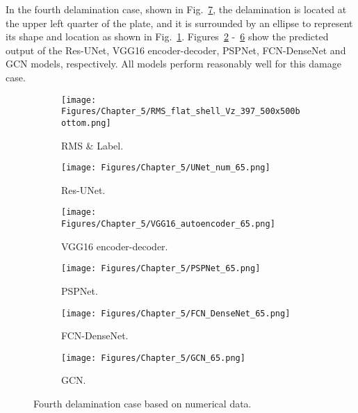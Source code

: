 In the fourth delamination case, shown in Fig.~\ref{fig:rms_fourth_case}, the delamination is located at the upper left quarter of the plate, and it is surrounded by an ellipse to represent its shape and location as shown in Fig.~\ref{fig:RMS_bottom_397}.
Figures~\ref{fig:unet_65} -~\ref{fig:gcn_65} show the predicted output of the Res-UNet, VGG16 encoder-decoder, PSPNet, FCN-DenseNet and GCN models, respectively. 
All models perform reasonably well for this damage case.
\begin{figure} [!h]
	\centering
	\begin{subfigure}[b]{.48\textwidth}
		\centering
		\texttt{[image: Figures/Chapter\_5/RMS\_flat\_shell\_Vz\_397\_500x500bottom.png]}
		\caption{RMS \& Label.}
		\label{fig:RMS_bottom_397}
	\end{subfigure}
	\hfill
	\begin{subfigure}[b]{.48\textwidth}
		\centering
		\texttt{[image: Figures/Chapter\_5/UNet\_num\_65.png]}
		\caption{Res-UNet.}
		\label{fig:unet_65}	
	\end{subfigure}
	\hfill
	\begin{subfigure}[b]{.48\textwidth}
		\centering
		\texttt{[image: Figures/Chapter\_5/VGG16\_autoencoder\_65.png]}
		\caption{VGG16 encoder-decoder.}
		\label{fig:vgg16_65}
	\end{subfigure}
	\hfill
	\begin{subfigure}[b]{.48\textwidth}
		\centering
		\texttt{[image: Figures/Chapter\_5/PSPNet\_65.png]}
		\caption{PSPNet.}
		\label{fig:pspnet_65}	
	\end{subfigure}
	\hfill
	\begin{subfigure}[b]{.48\textwidth}
		\centering
		\texttt{[image: Figures/Chapter\_5/FCN\_DenseNet\_65.png]}
		\caption{FCN-DenseNet.}
		\label{fig:densenet_65}
	\end{subfigure}
	\hfill
	\begin{subfigure}[b]{.48\textwidth}
		\centering
		\texttt{[image: Figures/Chapter\_5/GCN\_65.png]}
		\caption{GCN.}
		\label{fig:gcn_65}	
	\end{subfigure}
	\caption{Fourth delamination case based on numerical data.}
	\label{fig:rms_fourth_case}
\end{figure}
\clearpage

